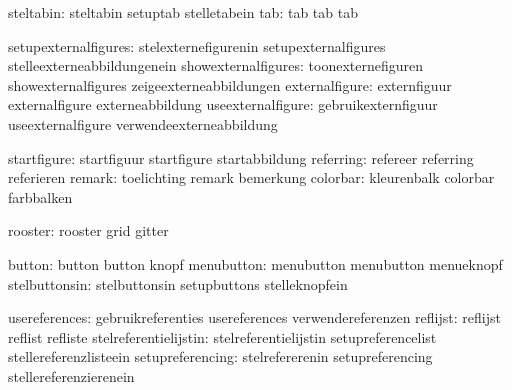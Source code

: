                     steltabin:  steltabin                    setuptab
                                stelletabein
                          tab:  tab                          tab
                                tab

         setupexternalfigures:  stelexternefigurenin         setupexternalfigures
                                stelleexterneabbildungenein
          showexternalfigures:  toonexternefiguren           showexternalfigures
                                zeigeexterneabbildungen
               externalfigure:  externfiguur                 externalfigure
                                externeabbildung
            useexternalfigure:  gebruikexternfiguur          useexternalfigure
                                verwendeexterneabbildung

                  startfigure:  startfiguur                  startfigure
                                startabbildung
                    referring:  refereer                     referring
                                referieren
                       remark:  toelichting                  remark
                                bemerkung
                     colorbar:  kleurenbalk                  colorbar
                                farbbalken

                      rooster:  rooster                      grid
                                gitter

                       button:  button                       button
                                knopf
                   menubutton:  menubutton                   menubutton
                                menueknopf
                stelbuttonsin:  stelbuttonsin                setupbuttons
                                stelleknopfein

                usereferences:  gebruikreferenties           usereferences
                                verwendereferenzen
                     reflijst:  reflijst                     reflist
                                refliste
        stelreferentielijstin:  stelreferentielijstin        setupreferencelist
                                stellereferenzlisteein
             setupreferencing:  stelrefererenin              setupreferencing
                                stellereferenzierenein

